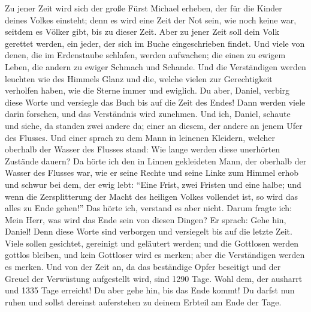  Zu jener Zeit wird sich der große Fürst Michael erheben,
der für die Kinder deines Volkes einsteht; denn es wird eine Zeit der
Not sein, wie noch keine war, seitdem es Völker gibt, bis zu dieser
Zeit. Aber zu jener Zeit soll dein Volk gerettet werden, ein jeder, der
sich im Buche eingeschrieben findet.  Und viele von denen,
die im Erdenstaube schlafen, werden aufwachen; die einen zu ewigem
Leben, die andern zu ewiger Schmach und Schande.  Und die
Verständigen werden leuchten wie des Himmels Glanz und die, welche
vielen zur Gerechtigkeit verholfen haben, wie die Sterne immer und
ewiglich.  Du aber, Daniel, verbirg diese Worte und
versiegle das Buch bis auf die Zeit des Endes! Dann werden viele darin
forschen, und das Verständnis wird zunehmen.  Und ich,
Daniel, schaute und siehe, da standen zwei andere da; einer an diesem,
der andere an jenem Ufer des Flusses.  Und einer sprach zu
dem Mann in leinenen Kleidern, welcher oberhalb der Wasser des Flusses
stand: Wie lange werden diese unerhörten Zustände dauern? 
Da hörte ich den in Linnen gekleideten Mann, der oberhalb der Wasser des
Flusses war, wie er seine Rechte und seine Linke zum Himmel erhob und
schwur bei dem, der ewig lebt: ``Eine Frist, zwei Fristen und eine
halbe; und wenn die Zersplitterung der Macht des heiligen Volkes
vollendet ist, so wird das alles zu Ende gehen!''  Das
hörte ich, verstand es aber nicht. Darum fragte ich: Mein Herr, was wird
das Ende sein von diesen Dingen?  Er sprach: Gehe hin,
Daniel! Denn diese Worte sind verborgen und versiegelt bis auf die
letzte Zeit.  Viele sollen gesichtet, gereinigt und
geläutert werden; und die Gottlosen werden gottlos bleiben, und kein
Gottloser wird es merken; aber die Verständigen werden es merken.
 Und von der Zeit an, da das beständige Opfer beseitigt
und der Greuel der Verwüstung aufgestellt wird, sind 1290 Tage.
 Wohl dem, der ausharrt und 1335 Tage erreicht!
 Du aber gehe hin, bis das Ende kommt! Du darfst nun
ruhen und sollst dereinst auferstehen zu deinem Erbteil am Ende der
Tage.
